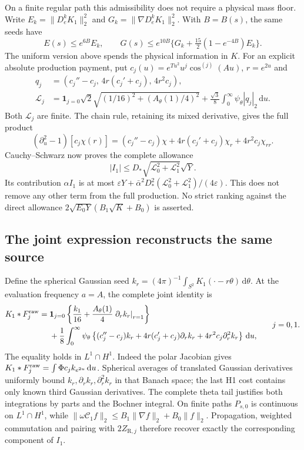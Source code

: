 \documentclass[11pt]{article}
\numberwithin{equation}{section}
\newcommand{\dd}{\,\mathrm d}
\begin{document}
On a finite regular path this admissibility does not require a physical
mass floor. Write $E_k=\|D_e^kK_1\|_2^2$ and
$G_k=\|\nabla D_e^kK_1\|_2^2$. With $B=B(s)$, the same seeds have
\[
 E(s)\le e^{6B}E_k,\qquad
 G(s)\le e^{10B}\{G_k+\tfrac{15}{2}(1-e^{-4B})E_k\}.
\]
The uniform version above spends the physical information in $K$.
For an explicit absolute production payment, put
$c_j(u)=e^{Tu^2}u^j\cos^{(j)}(Au)$, $r=e^{2u}$ and
\begin{align*}
 q_j&=(c_j''-c_j,\,4r(c_j'+c_j),\,4r^2c_j),\\
 \mathcal L_j&=\mathbf1_{j=0}\sqrt2
       \sqrt{(1/16)^2+(A_\theta(1)/4)^2}
       +\frac{\sqrt3}{8}\int_0^\infty\psi_\theta|q_j|_2\dd u.
\end{align*}
Both $\mathcal L_j$ are finite. The chain rule, retaining its mixed derivative,
gives the full product
\begin{equation}\label{eq:primitiveproductcost}
 (\partial_u^2-1)[c_j\chi(r)]
 =(c_j''-c_j)\chi+4r(c_j'+c_j)\chi_r+4r^2c_j\chi_{rr}.
\end{equation}
Cauchy--Schwarz now proves the complete allowance
\begin{equation}\label{eq:primitiveabsoluteallowance}
 |I_1|\le D_*\sqrt{\mathcal L_0^2+\mathcal L_1^2}\sqrt Y.
\end{equation}
Its contribution $\alpha I_1$ is at most
$\varepsilon Y+\bar\alpha^2D_*^2(\mathcal L_0^2+\mathcal L_1^2)/(4\varepsilon)$.
This does not remove any other term from the full production. No strict
ranking against the direct allowance
$2\sqrt{E_0Y}(B_1\sqrt K+B_0)$ is asserted.

\subsection{The joint expression reconstructs the same source}

Define the spherical Gaussian seed
$k_r=(4\pi)^{-1}\int_{S^2}K_1(\cdot-r\theta)\dd\theta$.
At the evaluation frequency $a=A$, the complete joint identity is
\begin{equation}\label{eq:primitivejointreconstruction}
 \begin{split}
 K_1*F_j^{\rm raw}={}&\mathbf1_{j=0}
 \left\{\frac{k_1}{16}
 +\frac{A_\theta(1)}4\left.\partial_rk_r\right|_{r=1}\right\}\\
 &+\frac18\int_0^\infty\psi_\theta
 \left\{(c_j''-c_j)k_r+4r(c_j'+c_j)\partial_rk_r
                   +4r^2c_j\partial_r^2k_r\right\}\dd u,
 \end{split}
 \qquad j=0,1.
\end{equation}
The equality holds in $L^1\cap H^1$. Indeed the polar Jacobian gives
$K_1*F_j^{\rm raw}=\int\Phi c_jk_{e^{2u}}\dd u$.
Spherical averages of translated Gaussian derivatives uniformly bound
$k_r,\partial_rk_r,\partial_r^2k_r$ in that Banach space; the last H1
cost contains only known third Gaussian derivatives. The complete theta
tail justifies both integrations by parts and the Bochner integral.
On finite paths $P_{s,0}$ is continuous on $L^1\cap H^1$, while
$\|\omega\mathscr C_1f\|_2\le B_1\|\nabla f\|_2+B_0\|f\|_2$.
Propagation, weighted commutation and pairing with $2Z_{\mathrm R,j}$
therefore recover exactly the corresponding component of $I_1$.
\end{document}
